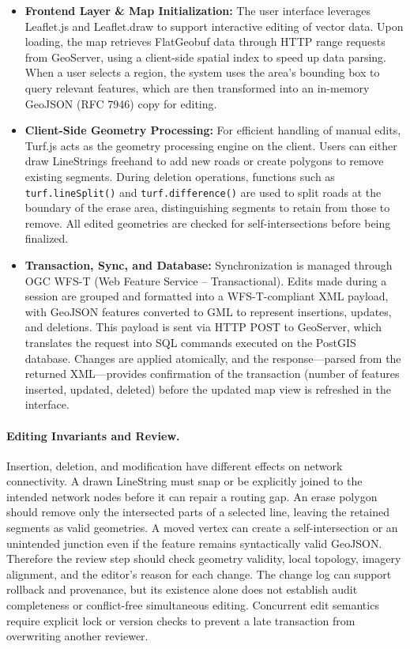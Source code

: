 \documentclass[10pt,a4paper,twocolumn]{article}
\begin{document}
\begin{itemize}
    \item \textbf{Frontend Layer \& Map Initialization:} The user interface leverages Leaflet.js and Leaflet.draw to support interactive editing of vector data. Upon loading, the map retrieves FlatGeobuf data through HTTP range requests from GeoServer, using a client-side spatial index to speed up data parsing. When a user selects a region, the system uses the area's bounding box to query relevant features, which are then transformed into an in-memory GeoJSON (RFC 7946) copy for editing.
    \item \textbf{Client-Side Geometry Processing:} For efficient handling of manual edits, Turf.js acts as the geometry processing engine on the client. Users can either draw LineStrings freehand to add new roads or create polygons to remove existing segments. During deletion operations, functions such as \texttt{turf.lineSplit()} and \texttt{turf.difference()} are used to split roads at the boundary of the erase area, distinguishing segments to retain from those to remove. All edited geometries are checked for self-intersections before being finalized.
    \item \textbf{Transaction, Sync, and Database:} Synchronization is managed through OGC WFS-T (Web Feature Service -- Transactional). Edits made during a session are grouped and formatted into a WFS-T-compliant XML payload, with GeoJSON features converted to GML to represent insertions, updates, and deletions. This payload is sent via HTTP POST to GeoServer, which translates the request into SQL commands executed on the PostGIS database. Changes are applied atomically, and the response---parsed from the returned XML---provides confirmation of the transaction (number of features inserted, updated, deleted) before the updated map view is refreshed in the interface.
\end{itemize}

\paragraph{Editing Invariants and Review.}
Insertion, deletion, and modification have different effects on network connectivity. A drawn LineString must snap or be explicitly joined to the intended network nodes before it can repair a routing gap. An erase polygon should remove only the intersected parts of a selected line, leaving the retained segments as valid geometries. A moved vertex can create a self-intersection or an unintended junction even if the feature remains syntactically valid GeoJSON. Therefore the review step should check geometry validity, local topology, imagery alignment, and the editor's reason for each change. The change log can support rollback and provenance, but its existence alone does not establish audit completeness or conflict-free simultaneous editing. Concurrent edit semantics require explicit lock or version checks to prevent a late transaction from overwriting another reviewer.
\end{document}
